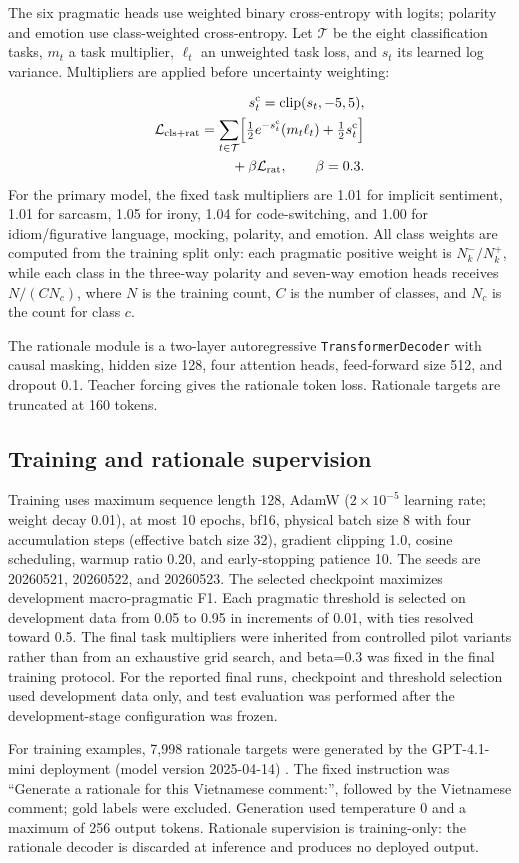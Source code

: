 The six pragmatic heads use weighted binary cross-entropy with logits; polarity and emotion use class-weighted cross-entropy. Let $\mathcal{T}$ be the eight classification tasks, $m_t$ a task multiplier, $\ell_t$ an unweighted task loss, and $s_t$ its learned log variance. Multipliers are applied before uncertainty weighting:

\[
\begin{aligned}
s_t^{\mathrm{c}}=\operatorname{clip}(s_t,-5,5), \\
\mathcal{L}_{\mathrm{cls+rat}}=\sum_{t\in\mathcal{T}}\Bigl[\tfrac12 e^{-s_t^{\mathrm{c}}}(m_t\ell_t)+\tfrac12s_t^{\mathrm{c}}\Bigr] \\
{}+\beta\mathcal{L}_{\mathrm{rat}},\qquad \beta=0.3.
\end{aligned}
\]
For the primary model, the fixed task multipliers are 1.01 for implicit sentiment, 1.01 for sarcasm, 1.05 for irony, 1.04 for code-switching, and 1.00 for idiom/figurative language, mocking, polarity, and emotion. All class weights are computed from the training split only: each pragmatic positive weight is $N_k^-/N_k^+$, while each class in the three-way polarity and seven-way emotion heads receives $N/(C N_c)$, where $N$ is the training count, $C$ is the number of classes, and $N_c$ is the count for class $c$.

The rationale module is a two-layer autoregressive \texttt{TransformerDecoder} with causal masking, hidden size 128, four attention heads, feed-forward size 512, and dropout 0.1. Teacher forcing gives the rationale token loss. Rationale targets are truncated at 160 tokens.

\subsection{Training and rationale supervision}
Training uses maximum sequence length 128, AdamW ($2\times10^{-5}$ learning rate; weight decay 0.01), at most 10 epochs, bf16, physical batch size 8 with four accumulation steps (effective batch size 32), gradient clipping 1.0, cosine scheduling, warmup ratio 0.20, and early-stopping patience 10. The seeds are 20260521, 20260522, and 20260523. The selected checkpoint maximizes development macro-pragmatic F1. Each pragmatic threshold is selected on development data from 0.05 to 0.95 in increments of 0.01, with ties resolved toward 0.5. The final task multipliers were inherited from controlled pilot variants rather than from an exhaustive grid search, and beta=0.3 was fixed in the final training protocol. For the reported final runs, checkpoint and threshold selection used development data only, and test evaluation was performed after the development-stage configuration was frozen.

For training examples, 7,998 rationale targets were generated by the GPT-4.1-mini deployment (model version 2025-04-14) \citep{openai-2025-gpt41-mini}. The fixed instruction was ``Generate a rationale for this Vietnamese comment:'', followed by the Vietnamese comment; gold labels were excluded. Generation used temperature 0 and a maximum of 256 output tokens. Rationale supervision is training-only: the rationale decoder is discarded at inference and produces no deployed output.
